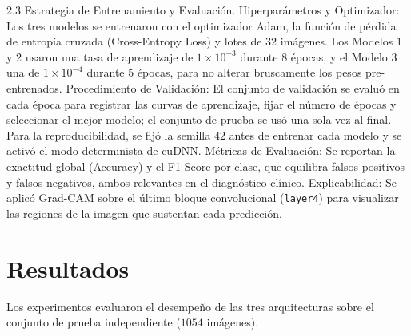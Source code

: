\documentclass[letterpaper, 10 pt, conference]{ieeeconf}  %
\begin{document}
2.3 Estrategia de Entrenamiento y Evaluación.
Hiperparámetros y Optimizador: Los tres modelos se entrenaron con el optimizador Adam, la función de pérdida de entropía cruzada (Cross-Entropy Loss) y lotes de $32$ imágenes. Los Modelos 1 y 2 usaron una tasa de aprendizaje de $1\times 10^{-3}$ durante $8$ épocas, y el Modelo 3 una de $1\times 10^{-4}$ durante $5$ épocas, para no alterar bruscamente los pesos pre-entrenados.
Procedimiento de Validación: El conjunto de validación se evaluó en cada época para registrar las curvas de aprendizaje, fijar el número de épocas y seleccionar el mejor modelo; el conjunto de prueba se usó una sola vez al final. Para la reproducibilidad, se fijó la semilla $42$ antes de entrenar cada modelo y se activó el modo determinista de cuDNN.
Métricas de Evaluación: Se reportan la exactitud global (Accuracy) y el F1-Score por clase, que equilibra falsos positivos y falsos negativos, ambos relevantes en el diagnóstico clínico.
Explicabilidad: Se aplicó Grad-CAM sobre el último bloque convolucional (\texttt{layer4}) para visualizar las regiones de la imagen que sustentan cada predicción.

\section{Resultados}

Los experimentos evaluaron el desempeño de las tres arquitecturas sobre el conjunto de prueba independiente ($1054$ imágenes).
\end{document}
